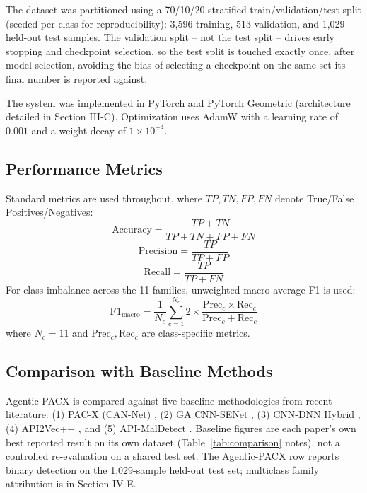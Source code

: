\documentclass[conference]{IEEEtran}
\newcommand{\TrainCount}{3,596}     %
\newcommand{\ValCount}{513}         %
\newcommand{\TestCount}{1,029}      %
\begin{document}
The dataset was partitioned using a 70/10/20 stratified train/validation/test split (seeded per-class for reproducibility): \TrainCount{} training, \ValCount{} validation, and \TestCount{} held-out test samples. The validation split -- not the test split -- drives early stopping and checkpoint selection, so the test split is touched exactly once, after model selection, avoiding the bias of selecting a checkpoint on the same set its final number is reported against.

The system was implemented in PyTorch and PyTorch Geometric (architecture detailed in Section III-C). Optimization uses AdamW with a learning rate of $0.001$ and a weight decay of $1\times 10^{-4}$.

\subsection{Performance Metrics}
Standard metrics are used throughout, where $TP, TN, FP, FN$ denote True/False Positives/Negatives:
\begin{equation}
\label{eq:accuracy}
\text{Accuracy} = \frac{TP+TN}{TP+TN+FP+FN}
\end{equation}
\begin{equation}
\label{eq:precision}
\text{Precision} = \frac{TP}{TP+FP}
\end{equation}
\begin{equation}
\label{eq:recall}
\text{Recall} = \frac{TP}{TP+FN}
\end{equation}
For class imbalance across the 11 families, unweighted macro-average F1 is used:
\begin{equation}
\label{eq:f1macro}
\text{F1}_{\text{macro}} = \frac{1}{N_c} \sum_{c=1}^{N_c} 2 \times \frac{\text{Prec}_c \times \text{Rec}_c}{\text{Prec}_c + \text{Rec}_c}
\end{equation}
where $N_c = 11$ and $\text{Prec}_c, \text{Rec}_c$ are class-specific metrics.

\subsection{Comparison with Baseline Methods}
Agentic-PACX is compared against five baseline methodologies from recent literature: (1) PAC-X (CAN-Net) \cite{b19}, (2) GA CNN-SENet \cite{b13}, (3) CNN-DNN Hybrid \cite{b17}, (4) API2Vec++ \cite{b15}, and (5) API-MalDetect \cite{b18}. Baseline figures are each paper's own best reported result on its own dataset (Table~\ref{tab:comparison} notes), not a controlled re-evaluation on a shared test set. The Agentic-PACX row reports binary detection on the \TestCount{}-sample held-out test set; multiclass family attribution is in Section IV-E.
\end{document}
